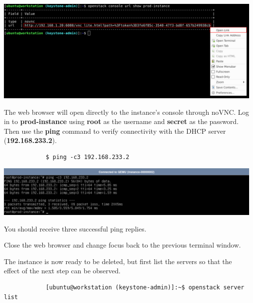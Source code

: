 \documentclass[letterpaper, 12pt]{article}
\begin{document}
\begin{enumerate}
\begin{labstep}
        \begin{center}
            \includegraphics[width=\linewidth]{images/part2/step10.png}
        \end{center}
    \end{labstep}

    \begin{labstep}
        The web browser will open directly to the instance's console through noVNC.
        Log in to \textbf{prod-instance} using \textbf{root} as the username and \textbf{secret} as the password.
        Then use the \textbf{ping} command to verify connectivity with the DHCP server (\textbf{192.168.233.2}).
        \begin{lstlisting}
            $ ping -c3 192.168.233.2
        \end{lstlisting}

        \begin{center}
            \includegraphics[width=\linewidth]{images/part2/step11.png}
        \end{center}
    \end{labstep}

    \begin{notebox}
        You should receive three successful ping replies.
    \end{notebox}

    \begin{labstep}
        Close the web browser and change focus back to the previous terminal window.
    \end{labstep}

    \begin{labstep}
        The instance is now ready to be deleted, but first list the servers so that the effect of the next step can be observed.
        \begin{lstlisting}
            [ubuntu@workstation (keystone-admin)]:~$ openstack server list
        \end{lstlisting}


\end{labstep}
\end{enumerate}
\end{document}

